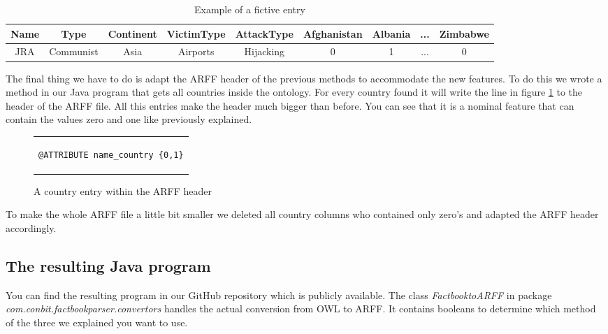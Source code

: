 \documentclass[a4]{article}
\begin{document}
\begin{table}[!h]
\centering
\begin{tabular}{|c|c|c|c|c|c|c|c|c|}\hline
Name & Type & Continent & VictimType & AttackType & Afghanistan & Albania & ... & Zimbabwe \\ \hline
JRA & Communist & Asia & Airports & Hijacking & 0 & 1 & ... & 0 \\ \hline
\end{tabular} 
\caption{Example of a fictive entry}
\label{fig:example_arrf_3}
\end{table}
The final thing we have to do is adapt the ARFF header of the previous methods to accommodate the new features. To do this we wrote a method in our Java program that gets all countries inside the ontology. For every country found it will write the line in figure \ref{fig:country_header} to the header of the ARFF file. All this entries make the header much bigger than before. You can see that it is a nominal feature that can contain the values zero and one like previously explained.
\begin{figure}[!h]
\centering
\begin{tabular}{c}
\begin{lstlisting}
@ATTRIBUTE name_country {0,1}
\end{lstlisting}
\end{tabular}
\caption{A country entry within the ARFF header}
\label{fig:country_header}
\end{figure}
To make the whole ARFF file a little bit smaller we deleted all country columns who contained only zero's and adapted the ARFF header accordingly.
\subsection{The resulting Java program}
You can find the resulting program in our GitHub repository\cite{githubproject} which is publicly available. The class \textit{FactbooktoARFF} in package \textit{com.conbit.factbookparser.convertors} handles the actual conversion from OWL to ARFF. It contains booleans to determine which method of the three we explained you want to use.
\end{document}
